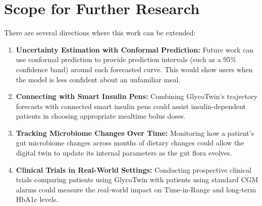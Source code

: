 \section{Scope for Further Research}
There are several directions where this work can be extended:
\begin{enumerate}
    \item \textbf{Uncertainty Estimation with Conformal Prediction:} Future work can use conformal prediction to provide prediction intervals (such as a 95\% confidence band) around each forecasted curve. This would show users when the model is less confident about an unfamiliar meal.
    \item \textbf{Connecting with Smart Insulin Pens:} Combining GlycoTwin's trajectory forecasts with connected smart insulin pens could assist insulin-dependent patients in choosing appropriate mealtime bolus doses.
    \item \textbf{Tracking Microbiome Changes Over Time:} Monitoring how a patient's gut microbiome changes across months of dietary changes could allow the digital twin to update its internal parameters as the gut flora evolves.
    \item \textbf{Clinical Trials in Real-World Settings:} Conducting prospective clinical trials comparing patients using GlycoTwin with patients using standard CGM alarms could measure the real-world impact on Time-in-Range and long-term HbA1c levels.
\end{enumerate}

